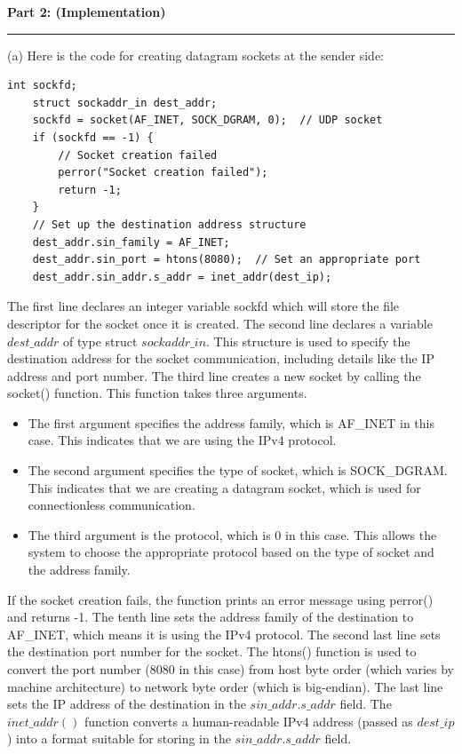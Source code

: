\documentclass[a4paper,12pt]{article}
\newenvironment{solution}[2][]{%
    \begin{mdframed}[linecolor=blue!70!black, linewidth=2pt, roundcorner=10pt, backgroundcolor=yellow!10!white, skipabove=12pt, skipbelow=12pt]%
        \textbf{\large #2}
        \par\noindent\rule{\textwidth}{0.4pt}
}{
    \end{mdframed}
}
\begin{document}
\clearpage

\begin{solution}{Part 2: (Implementation)}
(a) Here is the code for creating datagram sockets at the sender side:
\begin{lstlisting}[caption=Sender Datagram Socket Creation]
    int sockfd;
    struct sockaddr_in dest_addr;
    sockfd = socket(AF_INET, SOCK_DGRAM, 0);  // UDP socket
    if (sockfd == -1) {
        // Socket creation failed
        perror("Socket creation failed");
        return -1;
    }
    // Set up the destination address structure
    dest_addr.sin_family = AF_INET;
    dest_addr.sin_port = htons(8080);  // Set an appropriate port
    dest_addr.sin_addr.s_addr = inet_addr(dest_ip);
\end{lstlisting}
The first line declares an integer variable sockfd which will store the file descriptor for the socket once it is created. The second line declares a variable $dest\_addr$ of type struct $sockaddr\_in$. This structure is used to specify the destination address for the socket communication, including details like the IP address and port number. The third line creates a new socket by calling the socket() function. This function takes three arguments. 
\begin{itemize}
    \item The first argument specifies the address family, which is AF\_INET in this case. This indicates that we are using the IPv4 protocol.
    \item The second argument specifies the type of socket, which is SOCK\_DGRAM. This indicates that we are creating a datagram socket, which is used for connectionless communication.
    \item The third argument is the protocol, which is 0 in this case. This allows the system to choose the appropriate protocol based on the type of socket and the address family.
\end{itemize}
If the socket creation fails, the function prints an error message using perror() and returns -1. The tenth line sets the address family of the destination to AF\_INET, which means it is using the IPv4 protocol. The second last line sets the destination port number for the socket. The htons() function is used to convert the port number (8080 in this case) from host byte order (which varies by machine architecture) to network byte order (which is big-endian). The last line sets the IP address of the destination in the $sin\_addr.s\_addr$ field. The $inet\_addr()$ function converts a human-readable IPv4 address (passed as $dest\_ip$) into a format suitable for storing in the $sin\_addr.s\_addr$ field. 



\end{solution}
\end{document}

